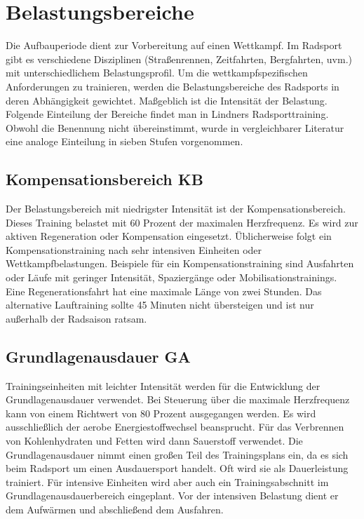 \section{Belastungsbereiche}
\label{grundlagen:sport:belastungsbereiche}
Die Aufbauperiode dient zur Vorbereitung auf einen Wettkampf. Im Radsport gibt es verschiedene Disziplinen (Straßenrennen, Zeitfahrten, Bergfahrten, uvm.) mit unterschiedlichem Belastungsprofil. Um die wettkampfspezifischen Anforderungen zu trainieren, werden die Belastungsbereiche des Radsports in deren Abhängigkeit gewichtet. Maßgeblich ist die Intensität der Belastung. Folgende Einteilung der Bereiche findet man in Lindners Radsporttraining. \cite[31-39]{Radsporttraining} Obwohl die Benennung nicht übereinstimmt, wurde in vergleichbarer Literatur \cite[27]{Ausdauertrainer} eine analoge Einteilung in sieben Stufen vorgenommen. 
\subsection{Kompensationsbereich KB}
Der Belastungsbereich mit niedrigster Intensität ist der Kompensationsbereich. Dieses Training belastet mit 60 Prozent der maximalen Herzfrequenz. Es wird zur aktiven Regeneration oder Kompensation eingesetzt. Üblicherweise folgt ein Kompensationstraining nach sehr intensiven Einheiten oder Wettkampfbelastungen. Beispiele für ein Kompensationstraining sind Ausfahrten oder Läufe mit geringer Intensität, Spaziergänge oder Mobilisationstrainings. \cite[31-32]{Radsporttraining}
Eine Regenerationsfahrt hat eine maximale Länge von zwei Stunden. Das alternative Lauftraining sollte 45 Minuten nicht übersteigen und ist nur außerhalb der Radsaison ratsam.
\subsection{Grundlagenausdauer GA}
Trainingseinheiten mit leichter Intensität werden für die Entwicklung der Grundlagenausdauer verwendet. Bei Steuerung über die maximale Herzfrequenz kann von einem Richtwert von 80 Prozent ausgegangen werden. Es wird ausschließlich der aerobe Energiestoffwechsel beansprucht. Für das Verbrennen von Kohlenhydraten und Fetten wird dann Sauerstoff verwendet. Die Grundlagenausdauer nimmt einen großen Teil des Trainingsplans ein, da es sich beim Radsport um einen Ausdauersport handelt. Oft wird sie als Dauerleistung trainiert. Für intensive Einheiten wird aber auch ein Trainingsabschnitt im Grundlagenausdauerbereich eingeplant. Vor der intensiven Belastung dient er dem Aufwärmen und abschließend dem Ausfahren.
